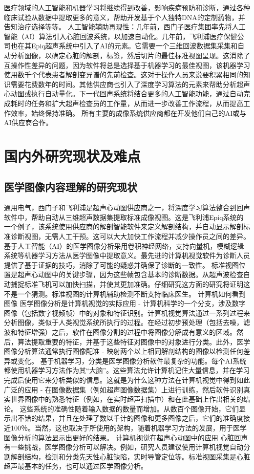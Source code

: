 医疗领域的人工智能和机器学习将继续得到改善，影响疾病预防和诊断，通过各种临床试验从数据中提取更多的意义，帮助开发基于个人独特DNA的定制药物，并告知治疗选择等等。
人工智能辅助再现性：几年前，西门子医疗集团率先将人工智能（AI）算法引入心脏回波系统，以加速自动化。几年前，飞利浦医疗保健公司也在其Epiq超声系统中引入了AI的元素。它需要一个三维回波数据集采集和自动分析图像，以确定心脏的解剖，标签，然后切片的最佳标准视图呈现。这消除了互操作性差异的问题，因为软件将总是选择基于机器学习的最佳视图，该机器学习使用数千个代表患者解剖变异谱的先前检查。这对于操作人员来说要积累相同的知识需要花费数年的时间。其他供应商也引入了深度学习算法的元素来帮助分析超声心动图或执行自动量化。下一代回声系统将结合更多的人工智能功能，通过自动完成耗时的任务和扩大超声检查员的工作量，从而进一步改善工作流程，从而提高工作效率，始终保持准确。
所有主要的成像系统供应商都在开发他们自己的AI或与AI供应商合作。          
\section{国内外研究现状及难点}
\subsection{医学图像内容理解的研究现状}
通用电气，西门子和飞利浦是超声心动图供应商之一，将深度学习算法整合到回声软件中，帮助自动从三维超声数据集提取标准成像视图。这是飞利浦Epiq系统的一个例子，该系统使用供应商的解剖智能软件来定义解剖结构，并自动显示解剖标准诊断视图，无需人工干预。这可以大大加快工作流程并减少操作员之间的差异。
基于人工智能（AI）的医学图像分析采用卷积神经网络，支持向量机，模糊逻辑系统等机器学习方法从医学图像中提取意义。最先进的计算机视觉软件为诊断人员提供了基于证据的技巧，消除了可能的疑惑并确保了诊断的一致性。
标准视图位置是超声心动图中的关键步骤，因为这些帧包含基本的诊断数据。从超声波检查自动捕捉标准飞机可以加快扫描，并使其更加准确。仔细研究这方面的研究将证明这不是一个猜测。标准视图的计算机辅助检测不断支持临床医生。
计算机如何看到图像
医学图像分析是计算机视觉的实际应用 - 计算机科学的一个分支，涉及数字图像（包括数字视频帧）中的对象和特征识别。计算机视觉算法通过一系列过程来分析图像，类似于人类视觉系统所执行的过程。在经过初步预处理（包括去噪，滤波和特征增强）之后，软件在图像分割的过程中将图像分解成有意义的区域。然后，算法提取重要的特征，并基于这些特征对图像中的对象进行分类。此外，医学图像分析算法通常执行图像配准 - 映射两个以上相同解剖结构的图像以检测任何差异或变化。
基于机器学习，分类是医学图像分析软件最复杂的功能。每个AI系统都使用机器学习方法作为其“大脑”。这些算法允许计算机记住大量信息，并在学习完成后使用它来分析类似的信息。这就是为什么这种方法在计算机视觉中得到如此广泛的应用 - 在图像数据集（例如超声图像数据集）上进行训练，然后软件识别真实世界图像中的熟悉特征（例如，在实时超声扫描中）和在此基础上作出相关的结论。
这些系统的准确性随着输入数据的数量而增加。从数百个图像开始，它们显示出不错的结果，并且在处理了数以千计的图像和更多图像之后，它们的准确度接近100％。当然，这也取决于所使用的架构，随着机器学习方法的发展，用于医学图像分析的算法显示出更好的结果。
计算机视觉在超声心动图中的应用
心脏回声有一些挑战，医学图像分析可以解决。例如，研究人员建议使用计算机视觉自动分割解剖结构，检测和分类先天性心脏缺陷，实时导管定位等。标准视图采集是心脏超声最基本的任务，也可以通过医学图像分析。
